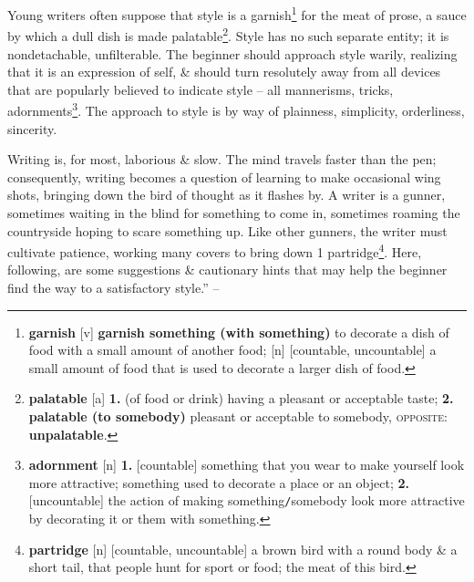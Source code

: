 \documentclass[oneside]{book}
\numberwithin{equation}{section}
\begin{document}
Young writers often suppose that style is a garnish\footnote{\textbf{garnish} [v] \textbf{garnish something (with something)} to decorate a dish of food with a small amount of another food; [n] [countable, uncountable] a small amount of food that is used to decorate a larger dish of food.} for the meat of prose, a sauce by which a dull dish is made palatable\footnote{\textbf{palatable} [a] \textbf{1.} (of food or drink) having a pleasant or acceptable taste; \textbf{2.} \textbf{palatable (to somebody)} pleasant or acceptable to somebody, \textsc{opposite}: \textbf{unpalatable}.}. Style has no such separate entity; it is nondetachable, unfilterable. The beginner should approach style warily, realizing that it is an expression of self, \& should turn resolutely away from all devices that are popularly believed to indicate style -- all mannerisms, tricks, adornments\footnote{\textbf{adornment} [n] \textbf{1.} [countable] something that you wear to make yourself look more attractive; something used to decorate a place or an object; \textbf{2.} [uncountable] the action of making something\texttt{/}somebody look more attractive by decorating it or them with something.}. The approach to style is by way of plainness, simplicity, orderliness, sincerity.

Writing is, for most, laborious \& slow. The mind travels faster than the pen; consequently, writing becomes a question of learning to make occasional wing shots, bringing down the bird of thought as it flashes by. A writer is a gunner, sometimes waiting in the blind for something to come in, sometimes roaming the countryside hoping to scare something up. Like other gunners, the writer must cultivate patience, working many covers to bring down 1 partridge\footnote{\textbf{partridge} [n] [countable, uncountable] a brown bird with a round body \& a short tail, that people hunt for sport or food; the meat of this bird.}. Here, following, are some suggestions \& cautionary hints that may help the beginner find the way to a satisfactory style.'' -- \cite[Chap. 5, pp. 75--77]{Strunk_White2019}
\end{document}
